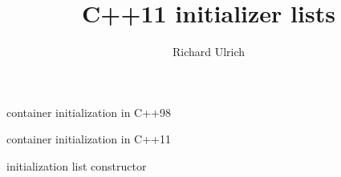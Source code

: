 \documentclass[11pt]{beamer}
\author{Richard Ulrich}
\title{C++11 initializer lists}
\institute{cubx Software AG}
\begin{document}
\begin{frame}
\titlepage
\end{frame}


\begin{frame}{container initialization in C++98}

\end{frame}

\begin{frame}{container initialization in C++11}

\end{frame}

\begin{frame}{initialization list constructor}

\end{frame}
\end{document}
